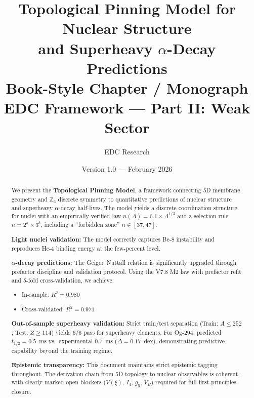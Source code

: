 \documentclass[11pt,a4paper]{article}
\title{%
    \textbf{Topological Pinning Model for Nuclear Structure}\\[0.5em]
    \Large and Superheavy $\alpha$-Decay Predictions\\[1em]
    \large Book-Style Chapter / Monograph\\[0.5em]
    \normalsize EDC Framework --- Part II: Weak Sector
}
\author{EDC Research}
\date{Version 1.0 --- February 2026}
\begin{document}
\maketitle


\begin{abstract}
\noindent
We present the \textbf{Topological Pinning Model}, a framework connecting 5D membrane geometry and $\mathbb{Z}_6$ discrete symmetry to quantitative predictions of nuclear structure and superheavy $\alpha$-decay half-lives. The model yields a discrete coordination structure for nuclei with an empirically verified law $n(A) = 6.1 \times A^{1/3}$ and a selection rule $n = 2^a \times 3^b$, including a ``forbidden zone'' $n \in [37, 47]$.

\textbf{Light nuclei validation:} The model correctly captures Be-8 instability and reproduces He-4 binding energy at the few-percent level.

\textbf{$\alpha$-decay predictions:} The Geiger--Nuttall relation is significantly upgraded through prefactor discipline and validation protocol. Using the V7.8 M2 law with prefactor refit and 5-fold cross-validation, we achieve:
\begin{itemize}[nosep]
    \item In-sample: $R^2 = 0.980$
    \item Cross-validated: $R^2 = 0.971$
\end{itemize}

\textbf{Out-of-sample superheavy validation:} Strict train/test separation (Train: $A \leq 252$; Test: $Z \geq 114$) yields 6/6 pass for superheavy elements. For Og-294: predicted $t_{1/2} = 0.5$~ms vs.\ experimental 0.7~ms ($\Delta = 0.17$~dex), demonstrating predictive capability beyond the training regime.

\textbf{Epistemic transparency:} This document maintains strict epistemic tagging throughout. The derivation chain from 5D topology to nuclear observables is coherent, with clearly marked open blockers ($V(\xi)$, $I_4$, $g_5$, $V_B$) required for full first-principles closure.

\end{abstract}

\newpage

\end{document}
